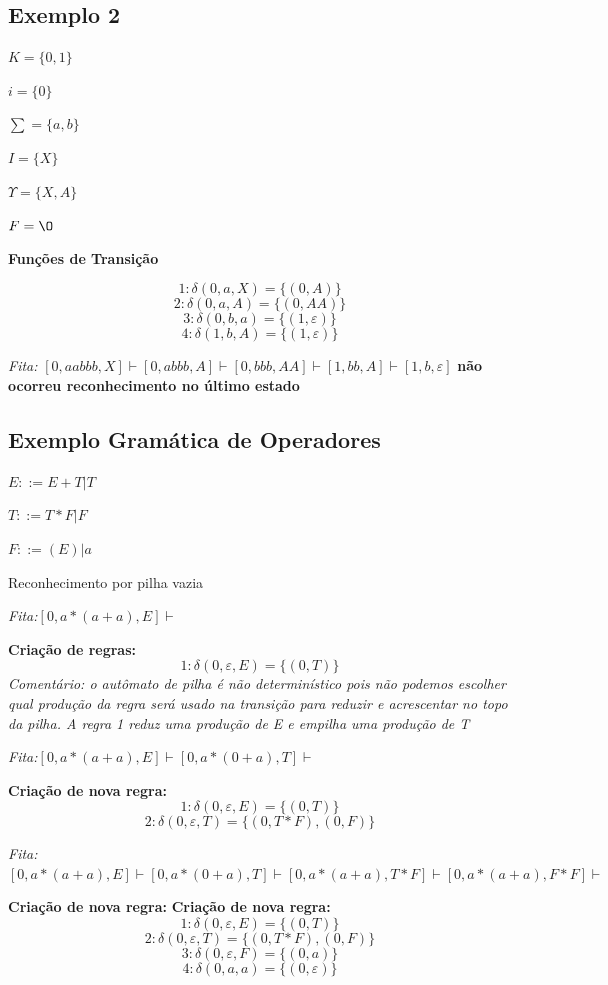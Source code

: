 \documentclass[ 12pt, a4paper]{article}
\begin{document}
		\subsection{Exemplo 2}
		
			$K=\{0,1\}$
			
			$i= \{0\}$
			
			$\sum = \{a,b\}$
			
			$I=\{X\}$
			
			$\Upsilon = \{X,A\}$
			
			$F = \O$
			
			\textbf{Funções de Transição}
			
			$$1:\delta(0,a,X) = \{(0,A)\}$$
			$$2:\delta(0,a,A) = \{(0,AA)\}$$
			$$3:\delta(0,b,a)= \{(1,\varepsilon)\}$$
			$$4:\delta(1,b,A)=\{(1,\varepsilon)\}$$
			
			\textit{Fita:} $[0,aabbb,X]\vdash [0,abbb,A] \vdash [0,bbb,AA] \vdash [1,bb,A] \vdash [1,b,\varepsilon]$ \textbf{não ocorreu reconhecimento no último estado}
			
		\subsection{Exemplo Gramática de Operadores}
		
			$E::= E+T | T$
			
			$T::= T*F | F$
			
			$F::= (E) | a$
			
			Reconhecimento por pilha vazia
			
			\textit{Fita:}$[0,a*(a+a),E]\vdash$
			
			\textbf{Criação de regras:}
			$$1: \delta(0,\varepsilon, E) = \{(0,T)\}$$
			\textit{Comentário: o autômato de pilha é não determinístico pois não podemos escolher qual produção da regra será usado na transição para reduzir e acrescentar no topo da pilha. A regra 1 reduz uma produção de E e empilha uma produção de T}
			
			\textit{Fita:}$[0,a*(a+a),E]\vdash [0,a*(0+a),T] \vdash$
			
			\textbf{Criação de nova regra:}
			$$1: \delta(0,\varepsilon, E) = \{(0,T)\}$$
			$$2: \delta(0,\varepsilon,T) = \{(0,T*F),(0,F)\}$$
			
			\textit{Fita:}$[0,a*(a+a),E]\vdash [0,a*(0+a),T] \vdash [0,a*(a+a),T*F] \vdash [0,a*(a+a), F*F] \vdash$
			
			\textbf{Criação de nova regra:}
			\textbf{Criação de nova regra:}
			$$1: \delta(0,\varepsilon, E) = \{(0,T)\}$$
			$$2: \delta(0,\varepsilon,T) = \{(0,T*F),(0,F)\}$$
			$$3:\delta(0,\varepsilon,F)=\{(0,a)\}$$
			$$4:\delta(0,a,a)=\{(0,\varepsilon)\}$$
			
\end{document}
